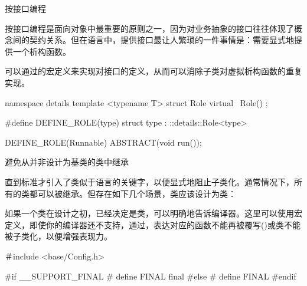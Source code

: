 \begin{content}

\begin{regulation}
按接口编程
\end{regulation}

按接口编程是面向对象中最重要的原则之一，因为对业务抽象的接口往往体现了概念间的契约关系。但在\cpp{}语言中，提供接口最让人繁琐的一件事情是：需要显式地提供一个析构函数。

可以通过的宏定义来实现对接口的定义，从而可以消除子类对虚拟析构函数的重复实现。

\begin{leftbar}
\begin{c++}
namespace details
{
   template <typename T>
   struct Role
   {
      virtual ~Role() {}
   };
}

#define DEFINE_ROLE(type) struct type : ::details::Role<type>
\end{c++}
\end{leftbar}

\begin{leftbar}
\begin{c++}
DEFINE_ROLE(Runnable)
{
    ABSTRACT(void run());
}
\end{c++}
\end{leftbar}

\begin{regulation}
避免从并非设计为基类的类中继承
\end{regulation}

直到\cpp{}标准才引入了类似于语言的关键字，以便显式地阻止子类化。通常情况下，所有的\cpp{}类都可以被继承。但存在如下几个场景，类应该设计为类：

\begin{enum}
\end{enum}

如果一个类在设计之初，已经决定是类，可以明确地告诉编译器。这里可以使用宏定义，即使你的编译器还不支持\cpp{}，通过，表达对应的函数不能再被覆写()或类不能被子类化，以便增强表现力。

\begin{leftbar}
\begin{c++}
＃include <base/Config.h>

#if __SUPPORT_FINAL
# define FINAL final
#else
# define FINAL
#endif
\end{c++}
\end{leftbar}


\end{content}
